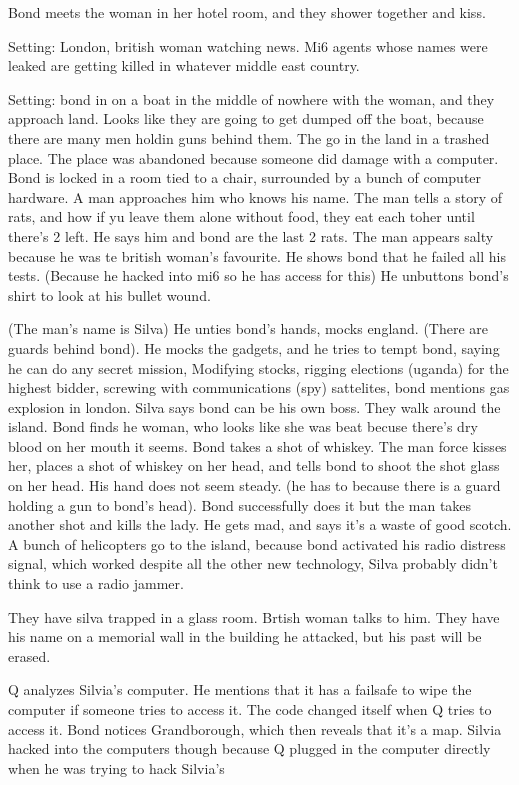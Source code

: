 \documentclass{article}
\begin{document}
    Bond meets the woman in her hotel room, and they shower together and kiss.

    Setting: London, british woman watching news. Mi6 agents whose names were leaked are getting killed
    in whatever middle east country.

    Setting: bond in on a boat in the middle of nowhere with the woman, and they approach land. Looks like they are going to get dumped off the boat, because there are many
    men holdin guns  behind them. The go in the land in a trashed place. The place was abandoned because
    someone did damage with a computer. Bond is locked in a room tied to a chair, surrounded by a bunch of computer
    hardware. A man approaches him who knows his name. The man tells a story of rats, and how
    if yu leave them alone without food, they eat each toher until there's 2 left. He says him and bond are the last 2 rats. The man appears salty because
    he was te british woman's favourite. He shows bond that he failed all his tests. (Because he hacked into mi6 so he has access for this)
    He unbuttons bond's shirt to look at his bullet wound.

    (The man's name is Silva)
    He unties bond's hands, mocks england. (There are guards behind bond). He mocks the gadgets, and he tries to tempt bond,
    saying he can do any secret mission, Modifying stocks, rigging elections (uganda) for the highest bidder, screwing with
    communications (spy) sattelites, bond mentions gas explosion in london. Silva says bond can be his own boss. They walk around the island. Bond finds he woman, who looks like she was beat becuse there's dry
    blood on her mouth it seems. Bond takes a shot of whiskey. The man force kisses her, places a shot of whiskey on her head, and
    tells bond to shoot the shot glass on her head. His hand does not seem steady.  (he has to because there is a guard holding a gun to bond's head).
    Bond successfully does it but the man takes another shot and kills the lady. He gets mad, and says it's a waste of good scotch.
    A bunch of helicopters go to the island, because bond activated his radio distress signal, which worked despite
    all the other new technology, Silva probably didn't think to use a radio jammer.

    They have silva trapped in a glass room. Brtish woman talks to him. They have his name on a memorial
    wall in the building he attacked, but his past will be erased.

    Q analyzes Silvia's computer. He mentions that it has a failsafe to wipe the computer if someone tries to access it.
    The code changed itself when Q tries to access it. Bond notices Grandborough, which then reveals that it's a map.
    Silvia hacked into the computers though because Q plugged in the computer directly when he was trying to hack Silvia's
\end{document}
